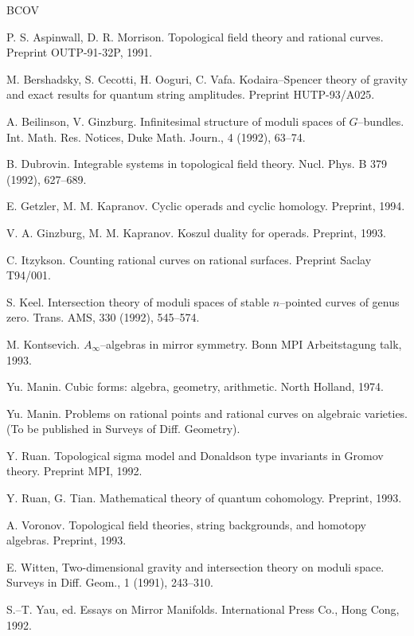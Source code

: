 \documentclass[reqno]{amsart}
\theoremstyle{definition}
\begin{document}
\begin{thebibliography}{BCOV}

  P. S. Aspinwall, D. R. Morrison. Topological field theory
  and rational curves. Preprint OUTP-91-32P, 1991.

  M. Bershadsky, S. Cecotti, H. Ooguri, C. Vafa. Kodaira--Spencer
  theory of gravity and exact results for quantum string amplitudes.
  Preprint HUTP-93/A025.

  A. Beilinson, V. Ginzburg. Infinitesimal structure of
  moduli spaces of $G$--bundles. Int. Math. Res. Notices,
  Duke Math. Journ., 4 (1992), 63--74.

  B. Dubrovin. Integrable systems in topological field theory.
  Nucl. Phys. B 379 (1992), 627--689.

  E. Getzler, M. M. Kapranov. Cyclic operads and cyclic homology.
  Preprint, 1994.

  V. A. Ginzburg, M. M. Kapranov. Koszul duality for operads.
  Preprint, 1993.

  C. Itzykson. Counting rational curves on rational surfaces.
  Preprint Saclay T94/001.

  S. Keel. Intersection theory of moduli spaces of stable
  $n$--pointed curves of genus zero. Trans. AMS, 330 (1992), 545--574.

  M. Kontsevich. $A_\infty$--algebras in mirror symmetry.
  Bonn MPI Arbeitstagung talk, 1993.

  Yu. Manin. Cubic forms: algebra, geometry, arithmetic.
  North Holland, 1974.

  Yu. Manin. Problems on rational points and rational curves
  on algebraic varieties. (To be published in Surveys of Diff. Geometry).

  Y. Ruan. Topological sigma model and Donaldson type invariants
  in Gromov theory. Preprint MPI, 1992.

  \smallskip

  Y. Ruan, G. Tian. Mathematical theory of quantum cohomology.
  Preprint, 1993.

  A. Voronov. Topological field theories, string backgrounds, and
  homotopy algebras. Preprint, 1993.

  E. Witten, Two-dimensional gravity and intersection theory
  on moduli space. Surveys in Diff. Geom., 1 (1991), 243--310.

  S.--T. Yau, ed. Essays on Mirror Manifolds. International Press
  Co., Hong Cong, 1992.

\end{thebibliography}


\end{document}
